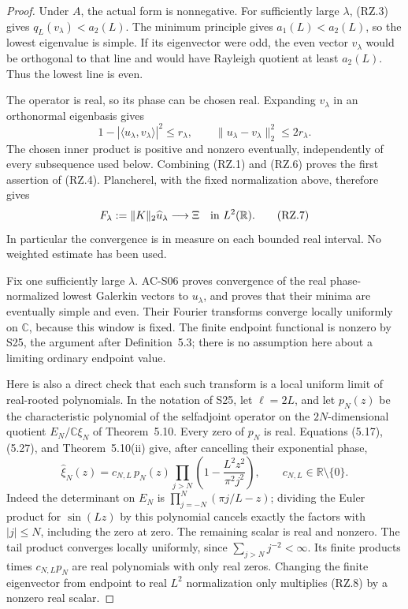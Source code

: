 \begin{proof}
Under \(A\), the actual form is nonnegative.  For sufficiently large
\(\lambda\), (RZ.3) gives \(q_L(v_\lambda)<a_2(L)\).  The minimum
principle gives \(a_1(L)<a_2(L)\), so the lowest eigenvalue is simple.
If its eigenvector were odd, the even vector \(v_\lambda\) would be
orthogonal to that line and would have Rayleigh quotient at least
\(a_2(L)\).  Thus the lowest line is even.

The operator is real, so its phase can be chosen real.  Expanding
\(v_\lambda\) in an orthonormal eigenbasis gives
\[
 1-|\langle u_\lambda,v_\lambda\rangle|^2\le r_\lambda,
 \qquad
 \|u_\lambda-v_\lambda\|_2^2\le2r_\lambda.
 \tag{RZ.6}
\]
The chosen inner product is positive and nonzero eventually, independently
of every subsequence used below.  Combining (RZ.1) and (RZ.6) proves
the first assertion of (RZ.4).  Plancherel, with the fixed normalization
above, therefore gives
\[
 F_\lambda:=\|K\|_2\widehat u_\lambda
                   \longrightarrow\Xi\quad\hbox{in }L^2(\mathbb R).
 \tag{RZ.7}
\]
In particular the convergence is in measure on each bounded real
interval.  No weighted estimate has been used.

Fix one sufficiently large \(\lambda\).  AC-S06 proves convergence
of the real phase-normalized lowest Galerkin vectors to
\(u_\lambda\), and proves that their minima are eventually simple
and even.  Their Fourier transforms converge locally uniformly on
\(\mathbb C\), because this window is fixed.  The finite endpoint
functional is nonzero by S25, the argument after Definition~5.3;
there is no assumption here about a limiting ordinary endpoint value.

Here is also a direct check that each such transform is a local uniform
limit of real-rooted polynomials.  In the notation of S25, let
\(\ell=2L\), and let \(p_N(z)\) be the characteristic polynomial
of the selfadjoint operator on the \(2N\)-dimensional quotient
\(E_N/\mathbb C\xi_N\) of Theorem~5.10.  Every zero of \(p_N\)
is real.  Equations (5.17), (5.27), and Theorem~5.10(ii) give,
after cancelling their exponential phase,
\[
 \widehat\xi_N(z)
   =c_{N,L}\,p_N(z)
      \prod_{j>N}\left(1-\frac{L^2z^2}{\pi^2j^2}\right),
                 \qquad c_{N,L}\in\mathbb R\setminus\{0\}.
 \tag{RZ.8}
\]
Indeed the determinant on \(E_N\) is
\(\prod_{j=-N}^N(\pi j/L-z)\); dividing the Euler product for
\(\sin(Lz)\) by this polynomial cancels exactly the factors with
\(|j|\le N\), including the zero at zero.  The remaining scalar
is real and nonzero.  The tail product converges locally uniformly,
since \(\sum_{j>N}j^{-2}<\infty\).  Its finite products times
\(c_{N,L}p_N\) are real polynomials with only real zeros.
Changing the finite eigenvector from endpoint to real \(L^2\)
normalization only multiplies (RZ.8) by a nonzero real scalar.


\end{proof}
